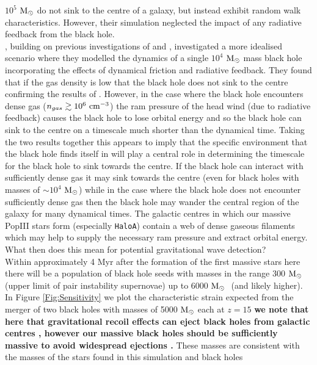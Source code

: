 \documentclass[twocolumn,iop,revtex4]{openjournal}
\newcommand{\msolar} {$\rm{M_{\odot}}~$}
\newcommand{\msolarc} {$\rm{M_{\odot}}$}
\newcommand{\hac} {\texttt{HaloA}}
\begin{document}
$10^5$ \msolar do not sink to the centre of a galaxy, but instead exhibit random walk characteristics.
However, their simulation neglected the impact of any radiative feedback from the black hole.\\
\indent \cite{Toyouchi_2020}, building on previous investigations of \cite{Park_2017} and \cite{Park_2019}, investigated a more idealised scenario where they modelled the
dynamics of a single $10^4$ \msolar mass black hole incorporating the effects of dynamical friction
and radiative feedback. They found that if the gas density is low that the black hole
does not sink to the centre confirming the results of \cite{Pfister_2019}. However, in the case where
the black hole encounters dense gas ($n_{gas} \gtrsim 10^6 \ \rm{cm}^{-3}$) the ram pressure of the head wind (due to radiative feedback)
causes the black hole to lose orbital energy and so the black hole can sink to the centre on a
timescale much shorter than the dynamical time. Taking the two results together this
appears to imply that the specific environment that the black hole finds
itself in will play a central role in determining the timescale for the black hole
to sink towards the centre. If the black hole can interact with sufficiently dense gas it may
sink towards the centre (even for black holes with masses of $\sim 10^4$ \msolarc) while in
the case where the black hole does not encounter sufficiently dense gas then the black hole
may wander the central region of the galaxy for many dynamical times. The galactic centres
in which our massive PopIII
stars form (especially \hac) contain a web of dense gaseous filaments which may help to supply
the necessary ram pressure and extract orbital energy. 
What then does this mean for potential gravitational wave detection?\\
\indent Within approximately 4 Myr after the formation of the first massive stars here there
will be a population of black hole seeds with masses in the range 300 \msolar (upper limit of pair
instability supernovae) up to 6000 \msolar
(and likely higher). In Figure \ref{Fig:Sensitivity} we plot the characteristic strain
expected from the merger of two black holes with masses of 5000 \msolar each at $z = 15$ \textbf{we note that here that gravitational recoil effects can eject black holes from galactic centres \citep[e.g.][]{Gultekin_2006}, however our massive black holes should be sufficiently massive to avoid widespread ejections \citep{Holley-Bockelmann_2008}.}
These masses are consistent with the masses of the stars found in this simulation and black holes
\end{document}
